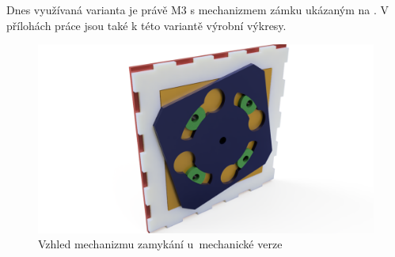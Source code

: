 \label{M3}
Dnes využívaná varianta je právě M3 s mechanizmem zámku ukázaným na .
V přílohách práce jsou také k této variantě výrobní výkresy.

\begin{figure}[h]
	\centering
    \includegraphics[width=\textwidth]{kapitoly/obrazky/M3/SOC_render.png}
    \caption{Vzhled mechanizmu zamykání u~mechanické verze}
    \label{fig:M3}
\end{figure}
